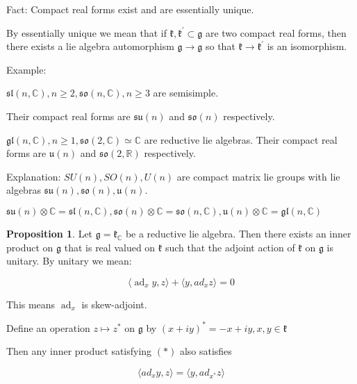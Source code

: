 \documentclass{article}
\theoremstyle{definition}
\newtheorem{proposition}{Proposition}
\newcommand{\ad}{\operatorname{ad}}
\begin{document}
Fact: Compact real forms exist and are essentially unique.

By essentially unique we mean that if \(\mathfrak{k} ,\mathfrak{k}^{\prime} \subset \mathfrak{g} \) are two compact real forms, then there exists a lie algebra automorphism \(\mathfrak{g} \to \mathfrak{g} \) so that \(\mathfrak{k}\to \mathfrak{k}^{\prime}  \) is an isomorphism. 

Example:

\(\mathfrak{sl}(n,\mathbb{C} ),n\geq 2,\mathfrak{so}(n,\mathbb{C} ),n\geq 3 \) are semisimple.

Their compact real forms are \(\mathfrak{su}(n) \) and \(\mathfrak{so}(n) \) respectively.

\(\mathfrak{gl} (n,\mathbb{C} ),n\geq 1,\mathfrak{so}(2,\mathbb{C} )\simeq\mathbb{C}  \) are reductive lie algebras. Their compact real forms are \(\mathfrak{u}(n) \) and \(\mathfrak{so}(2,\mathbb{R}) \) respectively.

Explanation: \(SU(n),SO(n),U(n)\) are compact matrix lie groups with lie algebras \(\mathfrak{su}(n),\mathfrak{so} (n),\mathfrak{u} (n) \).

\(\mathfrak{su} (n)\otimes \mathbb{C} =\mathfrak{sl} (n,\mathbb{C} ),\mathfrak{so}(n)\otimes \mathbb{C} =\mathfrak{so}(n,\mathbb{C} ),\mathfrak{u}(n)\otimes \mathbb{C} =\mathfrak{gl} (n,\mathbb{C} )   \) 

\begin{proposition}
    Let \(\mathfrak{g} =\mathfrak{k} _\mathbb{C} \) be a reductive lie algebra. Then there exists an inner product on \(\mathfrak{g}\) that is real valued on \(\mathfrak{k} \) such that the adjoint action of \(\mathfrak{k} \) on \(\mathfrak{g} \) is unitary. By unitary we mean:

    \begin{equation}\tag{\(*\) }
        \langle \ad_x y,z  \rangle +\langle y,ad_x z \rangle = 0
    \end{equation}

    This means \(\ad_x\) is skew-adjoint.

    Define an operation \(z\mapsto z^{\ast}\) on \(\mathfrak{g} \) by \((x+iy)^{\ast} =-x+iy,x,y\in \mathfrak{k} \)  

    Then any inner product satisfying \((*)\) also satisfies

    \[
        \langle ad_x y,z \rangle = \langle y,ad_{x^{\ast}} z \rangle 
    \]

\end{proposition}
\end{document}
